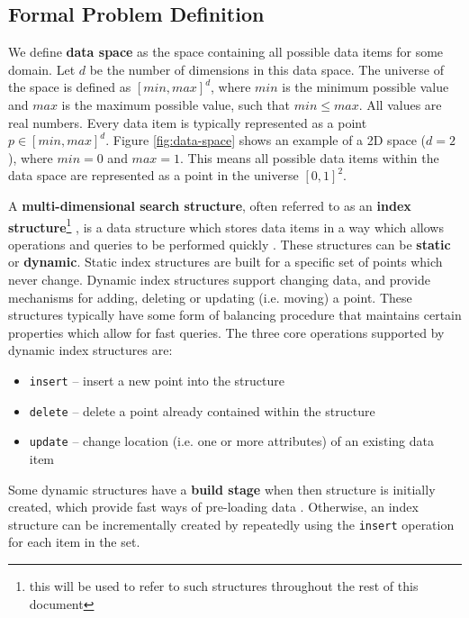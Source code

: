 \subsection{Formal Problem Definition}
\label{sec:definition}

We define \textbf{data space} as the space containing all possible data items for some domain. Let $d$ be the number of dimensions in this data space. The universe of the space is defined as $[min,max]^d$, where $min$ is the minimum possible value and $max$ is the maximum possible value, such that $min \leq max$. All values are real numbers. Every data item is typically represented as a point $p \in [min,max]^d$. Figure \ref{fig:data-space} shows an example of a 2D space ($d = 2$), where $min = 0$ and $max = 1$. This means all possible data items within the data space are represented as a point in the universe $[0, 1]^2$.

A \textbf{multi-dimensional search structure}, often referred to as an \textbf{index structure}\footnote{this will be used to refer to such structures throughout the rest of this document} \cite{r-tree-variants}, is a data structure which stores data items in a way which allows operations and queries to be performed quickly \cite{dynamic-data-structures}. These structures can be \textbf{static} or \textbf{dynamic}. Static index structures are built for a specific set of points which never change. Dynamic index structures support changing data, and provide mechanisms for adding, deleting or updating (i.e. moving) a point. These structures typically have some form of balancing procedure \cite{dynamic-data-structures} that maintains certain properties which allow for fast queries. The three core operations supported by dynamic index structures are:
\begin{itemize}
	\item \texttt{insert} -- insert a new point into the structure
	\item \texttt{delete} -- delete a point already contained within the structure
	\item \texttt{update} -- change location (i.e. one or more attributes) of an existing data item
\end{itemize}
Some dynamic structures have a \textbf{build stage} when then structure is initially created, which provide fast ways of pre-loading data \cite{pyramid-tree}. Otherwise, an index structure can be incrementally created by repeatedly using the \texttt{insert} operation for each item in the set.

